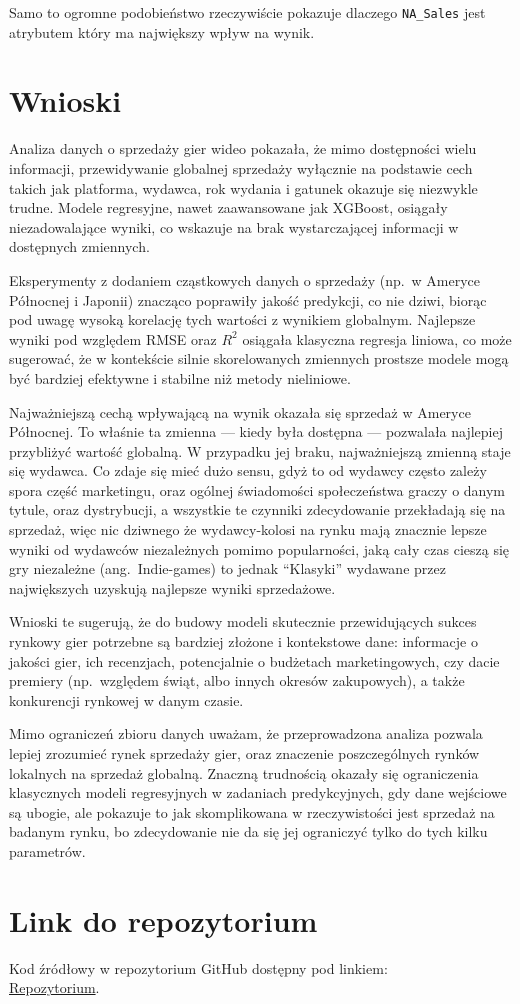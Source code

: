 \documentclass[11pt]{article}
\begin{document}
Samo to ogromne podobieństwo rzeczywiście pokazuje dlaczego \texttt{NA\_Sales} jest atrybutem który ma największy wpływ na wynik.


\section{Wnioski}\label{sec:wnioski}

Analiza danych o sprzedaży gier wideo pokazała, że mimo dostępności wielu informacji,
przewidywanie globalnej sprzedaży wyłącznie na podstawie cech takich jak platforma, wydawca, rok wydania i gatunek okazuje się niezwykle trudne.
Modele regresyjne, nawet zaawansowane jak XGBoost, osiągały niezadowalające wyniki,
co wskazuje na brak wystarczającej informacji w dostępnych zmiennych.

Eksperymenty z dodaniem cząstkowych danych o sprzedaży (np.~w Ameryce Północnej i Japonii) znacząco poprawiły jakość predykcji,
co nie dziwi, biorąc pod uwagę wysoką korelację tych wartości z wynikiem globalnym.
Najlepsze wyniki pod względem RMSE oraz \( R^2 \) osiągała klasyczna regresja liniowa, co może sugerować,
że w kontekście silnie skorelowanych zmiennych prostsze modele mogą być bardziej efektywne i stabilne niż metody nieliniowe.

Najważniejszą cechą wpływającą na wynik okazała się sprzedaż w Ameryce Północnej.
To właśnie ta zmienna — kiedy była dostępna — pozwalała najlepiej przybliżyć wartość globalną.
W przypadku jej braku, najważniejszą zmienną staje się wydawca.
Co zdaje się mieć dużo sensu, gdyż to od wydawcy często zależy spora część marketingu, oraz ogólnej świadomości społeczeństwa graczy o danym tytule, oraz dystrybucji,
a wszystkie te czynniki zdecydowanie przekładają się na sprzedaż, więc nic dziwnego że wydawcy-kolosi na rynku mają znacznie lepsze wyniki od wydawców niezależnych
pomimo popularności, jaką cały czas cieszą się gry niezależne (ang.~Indie-games) to jednak ``Klasyki'' wydawane przez największych uzyskują najlepsze wyniki sprzedażowe.

Wnioski te sugerują, że do budowy modeli skutecznie przewidujących sukces rynkowy gier potrzebne są bardziej złożone i kontekstowe dane:
informacje o jakości gier, ich recenzjach, potencjalnie o budżetach marketingowych, czy  dacie premiery
(np.~względem świąt, albo innych okresów zakupowych), a także konkurencji rynkowej w danym czasie.

Mimo ograniczeń zbioru danych uważam, że przeprowadzona analiza pozwala lepiej zrozumieć rynek sprzedaży gier, oraz
znaczenie poszczególnych rynków lokalnych na sprzedaż globalną.
Znaczną trudnością okazały się ograniczenia klasycznych modeli regresyjnych w zadaniach predykcyjnych,
gdy dane wejściowe są ubogie, ale pokazuje to jak skomplikowana w rzeczywistości jest sprzedaż na badanym rynku, bo zdecydowanie nie da się jej ograniczyć tylko do tych kilku parametrów.



\section{Link do repozytorium}\label{sec:link-do-repo}
Kod źródłowy w repozytorium GitHub dostępny pod linkiem: \\
\href{https://github.com/KotZPolibudy/PUT_SUS/tree/main/zdataset-analiza}{Repozytorium}.
\end{document}
